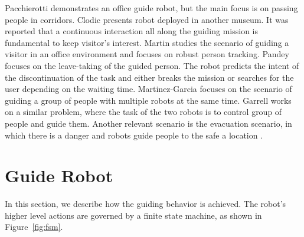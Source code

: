 Pacchierotti \cite{pacchierotti2006design} demonstrates an office guide robot, but the main focus is on passing people in corridors. Clodic \cite{clodic2006rackham} presents robot deployed in another museum. It was reported that a continuous interaction all along the guiding mission is fundamental to keep visitor's interest. Martin \cite{martin2004conception} studies the scenario of guiding a visitor in an office environment and focuses on robust person tracking. Pandey \cite{pandey2009step} focuses on the leave-taking of the guided person. The robot predicts the intent of the discontinuation of the task and either breaks the mission or searches for the user depending on the waiting time. Martinez-Garcia \cite{martinez2005crowding} focuses on the scenario of guiding a group of people with multiple robots at the same time. Garrell \cite{garrell2010local} works on a similar problem, where the task of the two robots is to control group of people and guide them. Another relevant scenario is the evacuation scenario, in which there is a danger and robots guide people to the safe a location \cite{kim2009portable,robinette2011incorporating}.

\section{Guide Robot}
\label{sec:guidance_guide_robot}

In this section, we describe how the guiding behavior is achieved. The robot's higher level actions are governed by a finite state machine, as shown in Figure~\ref{fig:fsm}. 

